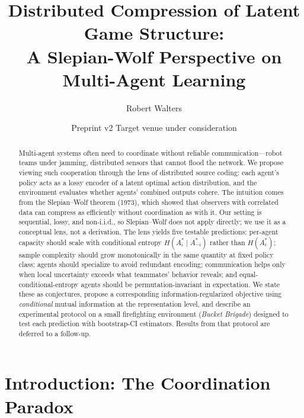 \documentclass[10pt, letterpaper]{article}
\title{Distributed Compression of Latent Game Structure:\\ A Slepian-Wolf Perspective on Multi-Agent Learning}
\author{Robert Walters}
\date{Preprint v2 \quad\textbar\quad Target venue under consideration}
\begin{document}
\maketitle

\begin{center}
\end{center}

\begin{abstract}
Multi-agent systems often need to coordinate without reliable communication---robot teams under jamming, distributed sensors that cannot flood the network. We propose viewing such cooperation through the lens of distributed source coding: each agent's policy acts as a lossy encoder of a latent optimal action distribution, and the environment evaluates whether agents' combined outputs cohere. The intuition comes from the Slepian--Wolf theorem (1973), which showed that observers with correlated data can compress as efficiently without coordination as with it. Our setting is sequential, lossy, and non-i.i.d., so Slepian--Wolf does not apply directly; we use it as a conceptual lens, not a derivation. The lens yields five testable predictions: per-agent capacity should scale with conditional entropy $H(A_i^* \mid A_{-i}^*)$ rather than $H(A_i^*)$; sample complexity should grow monotonically in the same quantity at fixed policy class; agents should specialize to avoid redundant encoding; communication helps only when local uncertainty exceeds what teammates' behavior reveals; and equal-conditional-entropy agents should be permutation-invariant in expectation. We state these as conjectures, propose a corresponding information-regularized objective using \emph{conditional} mutual information at the representation level, and describe an experimental protocol on a small firefighting environment (\emph{Bucket Brigade}) designed to test each prediction with bootstrap-CI estimators. Results from that protocol are deferred to a follow-up.
\end{abstract}

\section{Introduction: The Coordination Paradox}
\label{sec:introduction}
\end{document}
